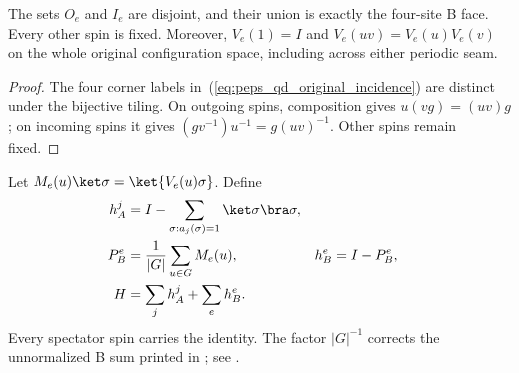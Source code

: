 \begin{theorem}
    \label{thm:peps_qd_original_action_support}
    \leanok
    The sets $O_e$ and $I_e$ are disjoint, and their union is exactly
    the four-site B face. Every other spin is fixed.
    Moreover, $V_e(1)=I$ and $V_e(uv)=V_e(u)V_e(v)$ on the whole
    original configuration space, including across either periodic seam.
\end{theorem}
\begin{proof}\leanok
    The four corner labels in~(\ref{eq:peps_qd_original_incidence}) are
    distinct under the bijective tiling. On outgoing spins, composition
    gives $u(vg)=(uv)g$; on incoming spins it gives
    $(gv^{-1})u^{-1}=g(uv)^{-1}$. Other spins remain fixed.
\end{proof}

\begin{definition}
    \label{def:peps_qd_original_hamiltonian}
    \leanok
    Let $M_e(u)\ket\sigma=\ket{V_e(u)\sigma}$. Define
    \begin{align}
        h_A^j&=I-\sum_{\sigma:a_j(\sigma)=1}\ket\sigma\bra\sigma,\\
        P_B^e&=\frac1{|G|}\sum_{u\in G}M_e(u),& h_B^e&=I-P_B^e,\\
        H&=\sum_j h_A^j+\sum_e h_B^e.
        \label{eq:peps_qd_original_hamiltonian}
    \end{align}
    Every spectator spin carries the identity. The factor $|G|^{-1}$
    corrects the unnormalized B sum printed in
    \cite[Section~7.2]{Schuch2010PEPS}; see
    \cite{gap:scp10_quantum_double_local_hamiltonian}.
\end{definition}


